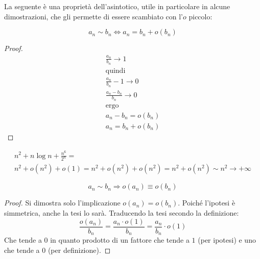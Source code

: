 La seguente è una proprietà dell'asintotico, utile in particolare in alcune dimostrazioni, che gli permette di essere scambiato con l'$o$ piccolo:
\begin{prop}
	\[
		a_n\sim b_n\iff a_n=b_n+o(b_n)
	\]
\end{prop}
\begin{proof}
	\begin{gather*}
		\frac{a_n}{b_n}\to1\\
		\text{quindi}\\
		\frac{a_n}{b_n}-1\to0\\
		\frac{a_n-b_n}{b_n}\to0\\
		\text{ergo}\\
		a_n-b_n=o(b_n)\\
		a_n=b_n+o(b_n)
	\end{gather*}
\end{proof}
\begin{examp}
	\begin{gather*}
		n^2+n\log n+\frac{n^6}{2^n}=\\
		n^2+o(n^2)+o(1)=n^2+o(n^2)+o(n^2)=n^2+o(n^2)\sim n^2\to+\infty
	\end{gather*}
\end{examp}

\begin{teor}
	\[
		a_n\sim b_n\Rightarrow o(a_n)\equiv o(b_n)
	\]
\end{teor}
\begin{proof}
	Si dimostra solo l'implicazione $o(a_n)=o(b_n)$. Poiché l'ipotesi è simmetrica, anche la tesi lo sarà. Traducendo la tesi secondo la definizione:
	\[
		\frac{o(a_n)}{b_n}=\frac{a_n\cdot o(1)}{b_n}=\frac{a_n}{b_n}\cdot o(1)
	\]
	Che tende a $0$ in quanto prodotto di un fattore che tende a $1$ (per ipotesi) e uno che tende a $0$ (per definizione).
\end{proof}
